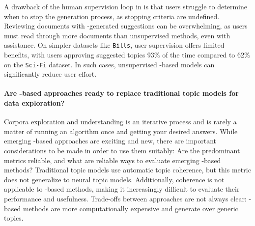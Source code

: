 A drawback of the human supervision loop in \bass{} is that users struggle to determine when to stop the generation process, as stopping criteria are undefined.
%
Reviewing documents with \mm{}-generated suggestions can be
overwhelming, as users must read through more documents than
unsupervised methods, even with \mm{} assistance.
%
On simpler datasets like \texttt{Bills}, user supervision offers limited
benefits, with users approving suggested topics 93\% of the time
compared to 62\% on the \texttt{Sci-Fi} dataset.
%
In such cases, 
unsupervised \mm{}-based models can significantly reduce user effort.



\paragraph{Are \mm{}-based approaches ready to replace traditional topic models for data exploration?}
%
Corpora exploration and understanding is an iterative process and is rarely a matter of
running an algorithm once and getting your desired answers.
% 
While emerging \mm{}-based approaches are exciting and new, there are
important considerations to be made in order to use them suitably: Are the predominant
metrics reliable, and what are reliable ways to evaluate emerging \mm{}-based methods?
%
Traditional topic models use automatic topic coherence, but this metric does not generalize to neural topic models.
%
Additionally, coherence is not applicable to \mm{}-based methods, making it increasingly difficult to evaluate their performance and usefulness.
%
Trade-offs between approaches are not always clear: \mm{}-based
methods are more computationally expensive and generate over generic topics.
%

